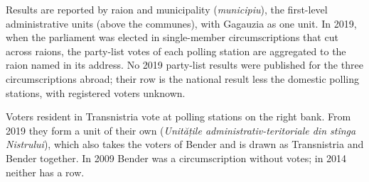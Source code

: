 Results are reported by raion and municipality (\textit{municipiu}), the
first-level administrative units (above the communes), with Gagauzia as one unit.  In 2019, when the
parliament was elected in single-member circumscriptions that cut across
raions, the party-list votes of each polling station are aggregated to the
raion named in its address.  No 2019 party-list results were published for
the three circumscriptions abroad; their row is the national result less the
domestic polling stations, with registered voters unknown.

Voters resident in Transnistria vote at polling stations on the right bank.
From 2019 they form a unit of their own (\textit{Unitățile
administrativ-teritoriale din stînga Nistrului}), which also takes the voters
of Bender and is drawn as Transnistria and Bender together.  In 2009 Bender was
a circumscription without votes; in 2014 neither has a row.

